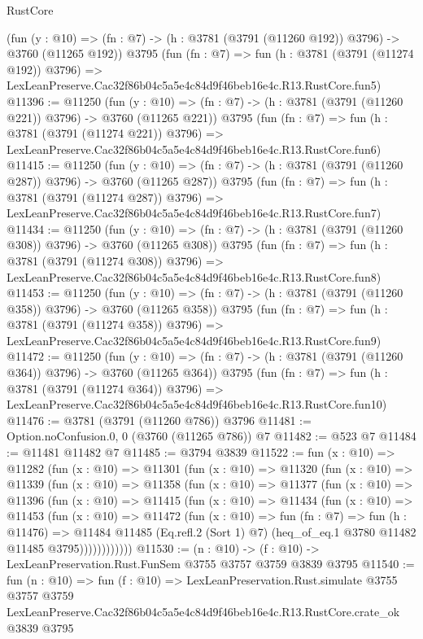 \begin{lexlean}{RustCore}
\begin{coremodule}
    (fun (y : @10) => (fn : @7) -> (h : @3781 (@3791 (@11260 @192)) @3796) -> @3760 (@11265 @192))
    @3795
    (fun (fn : @7) =>
    fun (h : @3781 (@3791 (@11274 @192)) @3796) =>
    LexLeanPreserve.Cac32f86b04c5a5e4c84d9f46beb16e4c.R13.RustCore.fun5)
@11396 := @11250
    (fun (y : @10) => (fn : @7) -> (h : @3781 (@3791 (@11260 @221)) @3796) -> @3760 (@11265 @221))
    @3795
    (fun (fn : @7) =>
    fun (h : @3781 (@3791 (@11274 @221)) @3796) =>
    LexLeanPreserve.Cac32f86b04c5a5e4c84d9f46beb16e4c.R13.RustCore.fun6)
@11415 := @11250
    (fun (y : @10) => (fn : @7) -> (h : @3781 (@3791 (@11260 @287)) @3796) -> @3760 (@11265 @287))
    @3795
    (fun (fn : @7) =>
    fun (h : @3781 (@3791 (@11274 @287)) @3796) =>
    LexLeanPreserve.Cac32f86b04c5a5e4c84d9f46beb16e4c.R13.RustCore.fun7)
@11434 := @11250
    (fun (y : @10) => (fn : @7) -> (h : @3781 (@3791 (@11260 @308)) @3796) -> @3760 (@11265 @308))
    @3795
    (fun (fn : @7) =>
    fun (h : @3781 (@3791 (@11274 @308)) @3796) =>
    LexLeanPreserve.Cac32f86b04c5a5e4c84d9f46beb16e4c.R13.RustCore.fun8)
@11453 := @11250
    (fun (y : @10) => (fn : @7) -> (h : @3781 (@3791 (@11260 @358)) @3796) -> @3760 (@11265 @358))
    @3795
    (fun (fn : @7) =>
    fun (h : @3781 (@3791 (@11274 @358)) @3796) =>
    LexLeanPreserve.Cac32f86b04c5a5e4c84d9f46beb16e4c.R13.RustCore.fun9)
@11472 := @11250
    (fun (y : @10) => (fn : @7) -> (h : @3781 (@3791 (@11260 @364)) @3796) -> @3760 (@11265 @364))
    @3795
    (fun (fn : @7) =>
    fun (h : @3781 (@3791 (@11274 @364)) @3796) =>
    LexLeanPreserve.Cac32f86b04c5a5e4c84d9f46beb16e4c.R13.RustCore.fun10)
@11476 := @3781 (@3791 (@11260 @786)) @3796
@11481 := Option.noConfusion.{0, 0} (@3760 (@11265 @786)) @7
@11482 := @523 @7
@11484 := @11481 @11482 @7
@11485 := @3794 @3839
@11522 := fun (x : @10) =>
  @11282
    (fun (x : @10) =>
    @11301
      (fun (x : @10) =>
      @11320
        (fun (x : @10) =>
        @11339
          (fun (x : @10) =>
          @11358
            (fun (x : @10) =>
            @11377
              (fun (x : @10) =>
              @11396
                (fun (x : @10) =>
                @11415
                  (fun (x : @10) =>
                  @11434
                    (fun (x : @10) =>
                    @11453
                      (fun (x : @10) =>
                      @11472
                        (fun (x : @10) =>
                        fun (fn : @7) =>
                        fun (h : @11476) =>
                        @11484
                          @11485
                          (Eq.refl.{2} (Sort 1) @7)
                          (heq_of_eq.{1} @3780 @11482 @11485 @3795))))))))))))
@11530 := (n : @10) -> (f : @10) -> LexLeanPreservation.Rust.FunSem @3755 @3757 @3759 @3839 @3795
@11540 := fun (n : @10) =>
  fun (f : @10) =>
  LexLeanPreservation.Rust.simulate
    @3755
    @3757
    @3759
    LexLeanPreserve.Cac32f86b04c5a5e4c84d9f46beb16e4c.R13.RustCore.crate_ok
    @3839
    @3795
\end{coremodule}
\end{lexlean}
